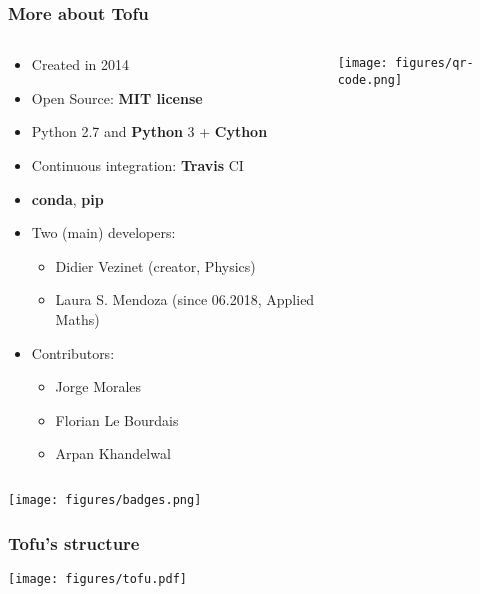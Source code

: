 \documentclass[10pt]{beamer}
\begin{document}
\begin{frame}
\frametitle{More about Tofu}

\begin{columns}
\begin{column}{0.65\textwidth}
\begin{itemize}
	\item Created in 2014
	\item Open Source:\textbf{ MIT license}
	\item Python 2.7 and \textbf{Python} 3 + \textbf{Cython}
	\item Continuous integration: \textbf{Travis} CI
	\item \textbf{conda}, \textbf{pip}
	\item Two (main) developers:
	\begin{itemize}
		\item Didier Vezinet (creator, Physics)
		\item Laura S. Mendoza (since 06.2018, Applied Maths)
	\end{itemize}
	\item Contributors:
	\begin{itemize}
		\item Jorge Morales
		\item Florian Le Bourdais
		\item Arpan Khandelwal
	\end{itemize}
\end{itemize}
\end{column}
\begin{column}{0.35\textwidth}
\begin{center}
    	\texttt{[image: figures/qr-code.png]}
\end{center}
\end{column}
\end{columns}
\begin{center}
    	\texttt{[image: figures/badges.png]}
\end{center}

\end{frame}

\begin{frame}
\frametitle{Tofu's structure}

\begin{center}
    	\texttt{[image: figures/tofu.pdf]}
\end{center}
	
\end{frame}
\end{document}
